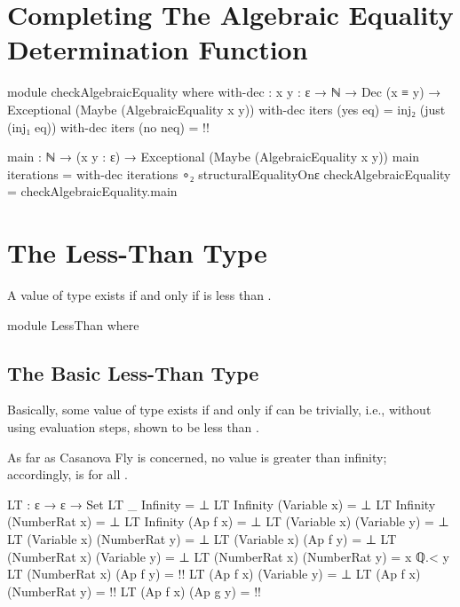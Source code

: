 \documentclass{report}
\begin{document}
\section{Completing The Algebraic Equality Determination Function}

\begin{code}
module checkAlgebraicEquality where
  with-dec : {x y : ε} →
             ℕ →
             Dec (x ≡ y) →
             Exceptional (Maybe (AlgebraicEquality x y))
  with-dec iters (yes eq) = inj₂ (just (inj₁ eq))
  with-dec iters (no neq) = {!!}

  main : ℕ → (x y : ε) → Exceptional (Maybe (AlgebraicEquality x y))
  main iterations = with-dec iterations ∘₂ structuralEqualityOnε
checkAlgebraicEquality = checkAlgebraicEquality.main
\end{code}

\section{The Less-Than Type}
A value of type    exists if and only if  is less than .

\begin{code}
module LessThan where
\end{code}

\subsection{The Basic Less-Than Type}
Basically, some value of type    exists if and only if  can be trivially, i.e., without using evaluation steps, shown to be less than .

As far as Casanova Fly is concerned, no value is greater than infinity; accordingly,    is  for all .

\begin{code}
  LT : ε → ε → Set
  LT _ Infinity = ⊥
  LT Infinity (Variable x) = ⊥
  LT Infinity (NumberRat x) = ⊥
  LT Infinity (Ap f x) = ⊥
  LT (Variable x) (Variable y) = ⊥
  LT (Variable x) (NumberRat y) = ⊥
  LT (Variable x) (Ap f y) = ⊥
  LT (NumberRat x) (Variable y) = ⊥
  LT (NumberRat x) (NumberRat y) = x ℚ.< y
  LT (NumberRat x) (Ap f y) = {!!}
  LT (Ap f x) (Variable y) = ⊥
  LT (Ap f x) (NumberRat y) = {!!}
  LT (Ap f x) (Ap g y) = {!!}
\end{code}
\end{document}
